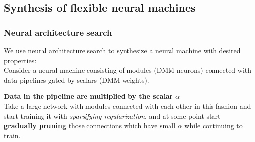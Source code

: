 \documentclass{beamer}
\begin{document}
\subsection{Synthesis of flexible neural machines}

\begin{frame}

  \frametitle{Neural architecture search}

We use neural architecture search to synthesize a neural machine with desired properties:\\[2ex]

Consider a neural machine consisting of modules (DMM neurons) 
connected with data pipelines gated by scalars (DMM weights).\\[2ex]


{\bf\small Data in the pipeline are multiplied by the scalar $\alpha$}\\[2ex]

Take a large network with modules connected with each other in this fashion and start training it
with {\em sparsifying regularization}, and at some point start {\bf gradually pruning} those connections
which have small $\alpha$ while continuing to train.


\end{frame}
\end{document}
